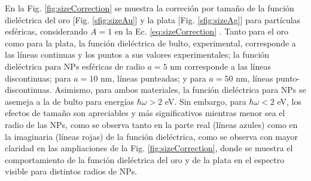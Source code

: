 %
%
%	
%	

En la Fig.  \ref{fig:sizeCorrection} se muestra la correción por tamaño de la función dieléctrica del oro [Fig. \ref{sfig:sizeAu}] y la plata [Fig.  \ref{sfig:sizeAg}] para partículas esféricas, considerando $A=1$ en la Ec. \eqref{eq:sizeCorrection} \cite{noguez2007surface}. Tanto para el oro como para la plata, la función dieléctrica de bulto, experimental, corresponde a las líneas continuas y los puntos a sus valores experimentales; la función dieléctrica para NPs esféricas de radio $a=5$ nm corresponde a las líneas discontinuas; para $a=10$ nm, líneas punteadas; y para $a=50$ nm, líneas punto-discontinuas. Asimismo, para ambos materiales, la función dieléctrica para NPs se asemeja a la de bulto para energías $\hbar\omega>2$ eV. Sin embargo, para $\hbar\omega<2$ eV, los efectos de tamaño son apreciables y más significativos mientras menor sea el radio de las NPs, como se observa tanto  en la parte real (líneas azules) como en la imaginaria (líneas rojas) de la función dieléctrica, como se observa con mayor claridad en las ampliaciones de la Fig. \ref{fig:sizeCorrection}, donde se muestra el comportamiento de la función dieléctrica del oro y de la plata en el espectro visible para distintos radios de NPs.

